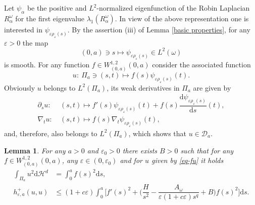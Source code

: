 \documentclass[11pt,oneside,reqno,a4paper]{amsart}
\newcommand{\dd}{\mathrm{d}}
\newcommand{\cD}{\mathcal{D}}
\renewcommand{\H}{\mathcal{H}}
\newcommand{\eps}{\varepsilon}
\newtheorem{lemma}[theorem]{Lemma}
\theoremstyle{definition}
\begin{document}
Let $\psi_\alpha$ be the positive and $L^2$-normalized eigenfunction of the Robin Laplacian $R^\omega_\alpha$ for the first eigenvalue $\lambda_1(R^\omega_\alpha)$. In view of the above representation one is interested in $\psi_{\eps \rho_\eps(s)}$. By the assertion (iii) of Lemma \ref{basic properties}, for any $\eps>0$ the map
\[
(0,a)\ni s\mapsto \psi_{\eps\rho_\eps(s)}\in L^2(\omega)
\]
is smooth. For any function $f\in W^{1,2}_{(0,a)}(0,a)$ consider the associated function
\begin{equation}
	\label{eq-fu}
u:\ \Pi_a\ni(s,t)\mapsto f(s)\psi_{\eps \rho_\eps(s)}(t).
\end{equation}
Obviously $u$ belongs to $L^2(\Pi_a)$, its weak derivatives in $\Pi_a$ are given by
\begin{align*}
\partial_s u:&\ (s,t)\mapsto f'(s)\psi_{\eps \rho_\eps(s)}(t)+f(s)\dfrac{\dd \psi_{\eps\rho_\eps(s)}}{\dd s}(t),\\
\nabla_t u:&\ (s,t)\mapsto f(s)\nabla_t \psi_{\eps \rho_\eps(s)}(t),
\end{align*}
and, therefore, also belongs to $L^2(\Pi_a)$, which shows that $u\in \cD_a$.


\begin{lemma}\label{lem41}
	For any $a>0$ and $\eps_0>0$ there exists $B>0$ such that for any
	$f\in W^{1,2}_{(0,a)}(0,a)$, any $\eps\in(0,\eps_0)$ and for $u$ given by \eqref{eq-fu} it holds
\begin{align*}
	\int_{\Pi_a}u^2\dd\H^d&=\int_0^a f(s)^2\dd s,\\	
	h^+_{\eps,a}(u,u)&\le (1+c\eps)\int_0^a \bigg[f'(s)^2 +\bigg(\dfrac{H}{s^2}-\dfrac{A_\omega}{\eps(1+c\eps)s^q}+B\bigg)f(s)^2\bigg]\dd s. \label{hplus3}
\end{align*}
\end{lemma}
\end{document}
